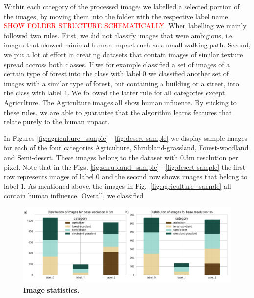 Within each category of the processed images we labelled a selected portion of the images, by moving them into the folder with the respective label name. \textcolor{red}{SHOW FOLDER STRUCTURE SCHEMATICALLY}. When labelling 
we mainly followed two rules. First, we did not classify images that were ambigious, i.e. images that showed minimal human impact such as a small walking path. Second, we put a lot of effort in creating datasets that contain images of similar texture spread accross both classes. If we for example classified a set of images of a certain type of forest into the class with label 0 we classified another set of images with a similar type of forest, but containing a building or a street, into the class with label 1. We followed the latter rule for all categories except Agriculture. The Agriculture images all show human influence.
By sticking to these rules, we are able to guarantee that the algorithm learns features that relate purely to the human impact. 

In Figures \ref{fig:agriculture_sample} - \ref{fig:desert-sample} we display sample images for each of the four categories Agriculture, Shrubland-grassland, Forest-woodland and Semi-desert. These images belong to the dataset with 0.3m resolution per pixel. Note that in the Figs. \ref{fig:shrubland_sample} - \ref{fig:desert-sample} the first row represents images of label 0 and the second row shows images that belong to label 1. As mentioned above, the images in Fig.~\ref{fig:agriculture_sample} all contain human influence. Overall, we classified 

\begin{figure}%
	\centering
	\captionsetup{width=1\linewidth}
	\includegraphics[width=1\textwidth]{Figures/imstats.pdf}
	\caption{\textbf{Image statistics.} }
	\label{fig:imstats}
\end{figure}

